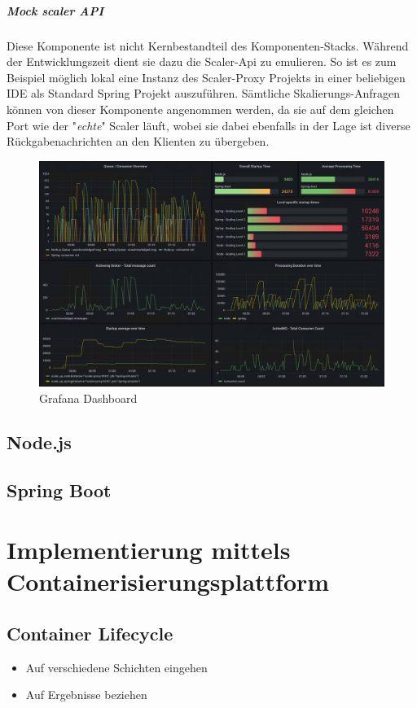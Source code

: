 \subparagraph{Mock scaler API}
Diese Komponente ist nicht Kernbestandteil des Komponenten-Stacks. Während der Entwicklungszeit dient sie dazu die Scaler-Api zu emulieren. So ist es zum Beispiel möglich lokal eine Instanz des Scaler-Proxy Projekts in einer beliebigen IDE als Standard Spring Projekt auszuführen. Sämtliche Skalierungs-Anfragen können von dieser Komponente angenommen werden, da sie auf dem gleichen Port wie der "\emph{echte}" Scaler läuft, wobei sie dabei ebenfalls in der Lage ist diverse Rückgabenachrichten an den Klienten zu übergeben.



\begin{figure}
	\centering
	\includegraphics[width=\linewidth]{kapitel/problemloesung/implementierung/_img/grafana-dashboard-01}
	\caption[]{Grafana Dashboard}
	\label{fig:grafanaOverview}
\end{figure}




\subsection{Node.js}
\subsection{Spring Boot}

\section{Implementierung mittels Containerisierungsplattform}
\subsection{Container Lifecycle}
\begin{itemize}
  \item Auf verschiedene Schichten eingehen
  \item Auf Ergebnisse beziehen
\end{itemize}
